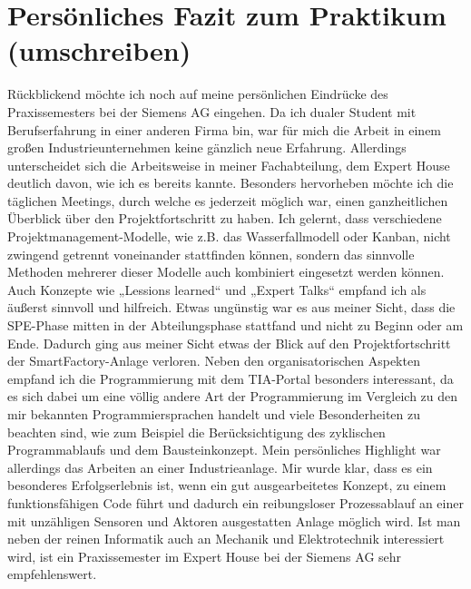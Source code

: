 \section{Persönliches Fazit zum Praktikum (umschreiben)}

Rückblickend möchte ich noch auf meine persönlichen Eindrücke des
Praxissemesters bei der Siemens AG eingehen.
Da ich dualer Student mit Berufserfahrung in einer anderen Firma bin, war für
mich die Arbeit in einem großen Industrieunternehmen keine gänzlich neue
Erfahrung. Allerdings unterscheidet sich die Arbeitsweise in meiner Fachabteilung,
dem Expert House deutlich davon, wie ich es bereits kannte. Besonders
hervorheben möchte ich die täglichen Meetings, durch welche es jederzeit möglich
war, einen ganzheitlichen Überblick über den Projektfortschritt zu haben. Ich
gelernt, dass verschiedene Projektmanagement-Modelle, wie z.B. das
Wasserfallmodell oder Kanban, nicht zwingend getrennt voneinander stattfinden
können, sondern das sinnvolle Methoden mehrerer dieser Modelle auch
kombiniert eingesetzt werden können. Auch Konzepte wie „Lessions learned“ und
„Expert Talks“ empfand ich als äußerst sinnvoll und hilfreich.
Etwas ungünstig war es aus meiner Sicht, dass die SPE-Phase mitten in der
Abteilungsphase stattfand und nicht zu Beginn oder am Ende. Dadurch ging aus
meiner Sicht etwas der Blick auf den Projektfortschritt der SmartFactory-Anlage
verloren. Neben den organisatorischen Aspekten empfand ich die
Programmierung mit dem TIA-Portal besonders interessant, da es sich dabei um
eine völlig andere Art der Programmierung im Vergleich zu den mir bekannten
Programmiersprachen handelt und viele Besonderheiten zu beachten sind, wie
zum Beispiel die Berücksichtigung des zyklischen Programmablaufs und dem
Bausteinkonzept. Mein persönliches Highlight war allerdings das Arbeiten an einer
Industrieanlage. Mir wurde klar, dass es ein besonderes Erfolgserlebnis ist, wenn
ein gut ausgearbeitetes Konzept, zu einem funktionsfähigen Code führt und
dadurch ein reibungsloser Prozessablauf an einer mit unzähligen Sensoren und
Aktoren ausgestatten Anlage möglich wird. Ist man neben der reinen Informatik
auch an Mechanik und Elektrotechnik interessiert wird, ist ein Praxissemester im
Expert House bei der Siemens AG sehr empfehlenswert.